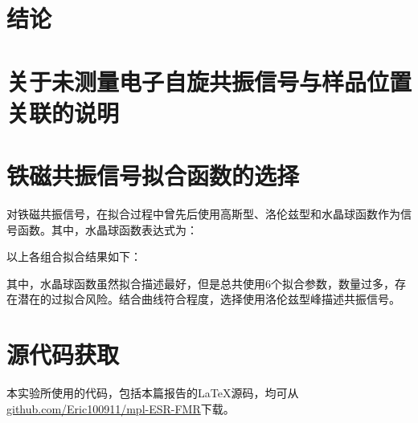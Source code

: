 \documentclass{thuemp}
\begin{document}
\section{结论}



\renewcommand\refname{\heiti\wuhao\centerline{参考文献}\global\def\refname{参考文献}}
\vskip 12pt

\let\OLDthebibliography\thebibliography
\renewcommand\thebibliography[1]{
  \OLDthebibliography{#1}
  \setlength{\parskip}{0pt}
  \setlength{\itemsep}{0pt plus 0.3ex}
}

{
\renewcommand{\baselinestretch}{0.9}
\liuhao


}
\newpage
\appendix

\section{关于未测量电子自旋共振信号与样品位置关联的说明}



\section{铁磁共振信号拟合函数的选择}

对铁磁共振信号，在拟合过程中曾先后使用高斯型、洛伦兹型和水晶球函数作为信号函数。其中，水晶球函数表达式为：


以上各组合拟合结果如下：


其中，水晶球函数虽然拟合描述最好，但是总共使用6个拟合参数，数量过多，存在潜在的过拟合风险。结合曲线符合程度，选择使用洛伦兹型峰描述共振信号。



\section{源代码获取}

本实验所使用的代码，包括本篇报告的\LaTeX 源码，均可从\url{github.com/Eric100911/mpl-ESR-FMR}下载。
\end{document}
